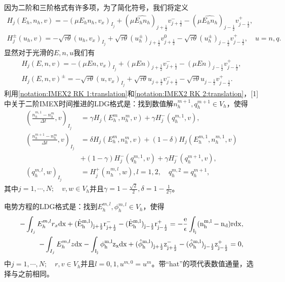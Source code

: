 因为二阶和三阶格式有许多项，为了简化符号，我们将定义
\begin{align}
    H_j(E_h,n_h,v) = - (\mu E_h n_h, v_x)_{I_j} + (\mu \hat{E_h n_h})_{j+\frac{1}{2}}v_{j+\frac{1}{2}}^- - (\mu \hat{E_h n_h})_{j-\frac{1}{2}}v_{j-\frac{1}{2}}^+, \label{notation:IMEX2 RK 1:translation} \\
    H_j^{\pm}(u_h,v) =- \sqrt{\tau \theta}(u_h,v_x)_{I_j} + \sqrt{\tau\theta}(u_h^{\pm})_{j+\frac{1}{2}}v_{j+\frac{1}{2}}^0 - \sqrt{\tau\theta}(u_h^{\pm})_{j-\frac{1}{2}}v_{j-\frac{1}{2}}^+,\quad u = n,q.\label{notation:IMEX2 RK 2:translation}
\end{align}
显然对于光滑的$E,n,u$我们有
\begin{align*}
    H_j(E,n,v) = -(\mu En,v_x)_{I_j} + (\mu En)_{j+\frac{1}{2}}v_{j+\frac{1}{2}}^- - (\mu En)_{j-\frac{1}{2}}v_{j-\frac{1}{2}}^+, \\
    H_j(E,n,v)^{\pm} = - \sqrt{\tau\theta}(u,v_x)_{I_j} + \sqrt{\tau\theta}u_{j+\frac{1}{2}}v_{j+\frac{1}{2}}^- - \sqrt{\tau\theta}u_{j-\frac{1}{2}}v_{j-\frac{1}{2}}^+.
\end{align*}
利用\eqref{notation:IMEX2 RK 1:translation}和\eqref{notation:IMEX2 RK 2:translation}，[1]中关于二阶IMEX时间推进的LDG格式是：找到数值解$n_h^{m+1},q_h^{m+1}\in V_h$，使得
\begin{align}
    (\frac{n_h^{m,1} -n_h^m}{\Delta t},v)_{I_j} & = \gamma H_j(E_h^m,n_h^m,v) + \gamma H_j^-(q_h^{m,1},v),                     \label{weakForm:IMEX2 LDG 1:translation} \\
    (\frac{n_h^{m+1} -n_h^m}{\Delta t},v)_{I_j} & = \delta H_j(E_h^m,n_h^m,v) + (1-\delta)H_j(E_h^{m,1},n_h^{m,1},v) \nonumber                                          \\
                                                & +(1-\gamma)H_j^-(q_h^{m,1},v) + \gamma H_j^-(q_h^{m+1},v),                                                            \\
    (q_h^{m,l},w)_{I_j}                         & = H_j^+(n_h^{m,l},w), l = 1,2, \quad q_h^{m,2} = q_h^{m+1},\label{weakForm:IMEX2 LDG 3:translation}
\end{align}
其中$j = 1,\cdots,N;\quad v,w \in V_h$并且$\gamma = 1- \frac{\sqrt{2}}{2},\delta = 1 - \frac{1}{2\gamma}$。

电势方程的LDG格式是：找到$E_h^{m,l},\phi_h^{m,l} \in V_h$，使得
\begin{align}
    -\int_{I_j} E_h^{m,l}r_x \rm{d}x + (\hat{E}_h^{m,l})_{j+\frac{1}{2}}r_{j+\frac{1}{2}}^- - (\hat{E}_h^{m,l})_{j-\frac{1}{2}}r_{j-\frac{1}{2}}^+ = -\frac{e}{\epsilon}\int_{I_j}(n_h^{m,l} - n_d) r\rm{d} x, \label{equation:IMEX2 LDG:EPE 1:translation} \\
    -\int_{I_j} E_h^{m,l}z \rm{d}x - \int_{I_j} \phi_h^{m,l}z_x \rm{d}x  + (\hat{\phi}_h^{m,l})_{j+\frac{1}{2}}z^-_{j+\frac{1}{2}} - (\hat{\phi}_h^{m,l})_{j-\frac{1}{2}}z_{j-\frac{1}{2}}^+  = 0, \label{equation:IMEX2 LDG:EPE 2:translation}
\end{align}
中$j = 1,\cdots,N;\quad r,v \in V_h$并且$l = 0,1, u^{m,0} = u^m$。带“hat”的项代表数值通量，选择与之前相同。

